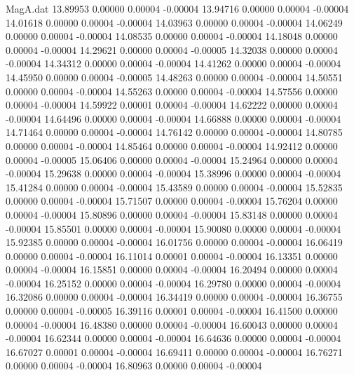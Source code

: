 \begin{filecontents}{MagA.dat}
  13.89953    0.00000    0.00004   -0.00004
  13.94716    0.00000    0.00004   -0.00004
  14.01618    0.00000    0.00004   -0.00004
  14.03963    0.00000    0.00004   -0.00004
  14.06249    0.00000    0.00004   -0.00004
  14.08535    0.00000    0.00004   -0.00004
  14.18048    0.00000    0.00004   -0.00004
  14.29621    0.00000    0.00004   -0.00005
  14.32038    0.00000    0.00004   -0.00004
  14.34312    0.00000    0.00004   -0.00004
  14.41262    0.00000    0.00004   -0.00004
  14.45950    0.00000    0.00004   -0.00005
  14.48263    0.00000    0.00004   -0.00004
  14.50551    0.00000    0.00004   -0.00004
  14.55263    0.00000    0.00004   -0.00004
  14.57556    0.00000    0.00004   -0.00004
  14.59922    0.00001    0.00004   -0.00004
  14.62222    0.00000    0.00004   -0.00004
  14.64496    0.00000    0.00004   -0.00004
  14.66888    0.00000    0.00004   -0.00004
  14.71464    0.00000    0.00004   -0.00004
  14.76142    0.00000    0.00004   -0.00004
  14.80785    0.00000    0.00004   -0.00004
  14.85464    0.00000    0.00004   -0.00004
  14.92412    0.00000    0.00004   -0.00005
  15.06406    0.00000    0.00004   -0.00004
  15.24964    0.00000    0.00004   -0.00004
  15.29638    0.00000    0.00004   -0.00004
  15.38996    0.00000    0.00004   -0.00004
  15.41284    0.00000    0.00004   -0.00004
  15.43589    0.00000    0.00004   -0.00004
  15.52835    0.00000    0.00004   -0.00004
  15.71507    0.00000    0.00004   -0.00004
  15.76204    0.00000    0.00004   -0.00004
  15.80896    0.00000    0.00004   -0.00004
  15.83148    0.00000    0.00004   -0.00004
  15.85501    0.00000    0.00004   -0.00004
  15.90080    0.00000    0.00004   -0.00004
  15.92385    0.00000    0.00004   -0.00004
  16.01756    0.00000    0.00004   -0.00004
  16.06419    0.00000    0.00004   -0.00004
  16.11014    0.00001    0.00004   -0.00004
  16.13351    0.00000    0.00004   -0.00004
  16.15851    0.00000    0.00004   -0.00004
  16.20494    0.00000    0.00004   -0.00004
  16.25152    0.00000    0.00004   -0.00004
  16.29780    0.00000    0.00004   -0.00004
  16.32086    0.00000    0.00004   -0.00004
  16.34419    0.00000    0.00004   -0.00004
  16.36755    0.00000    0.00004   -0.00005
  16.39116    0.00001    0.00004   -0.00004
  16.41500    0.00000    0.00004   -0.00004
  16.48380    0.00000    0.00004   -0.00004
  16.60043    0.00000    0.00004   -0.00004
  16.62344    0.00000    0.00004   -0.00004
  16.64636    0.00000    0.00004   -0.00004
  16.67027    0.00001    0.00004   -0.00004
  16.69411    0.00000    0.00004   -0.00004
  16.76271    0.00000    0.00004   -0.00004
  16.80963    0.00000    0.00004   -0.00004

\end{filecontents}
